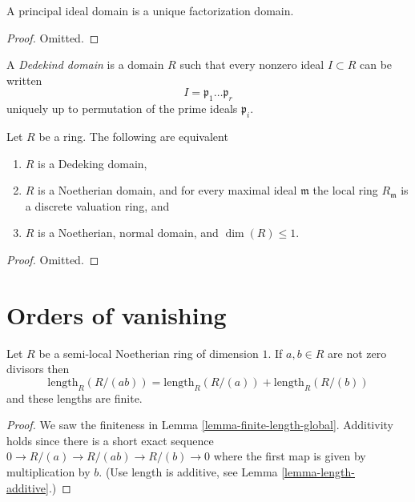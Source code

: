 \begin{lemma}
\label{lemma-PID-UFD}
A principal ideal domain is a unique factorization domain.
\end{lemma}

\begin{proof}
Omitted.
\end{proof}

\begin{definition}
\label{definition-dedekind-domain}
A {\it Dedekind domain} is a domain $R$ such that every
nonzero ideal $I \subset R$ can be written
$$
I = \mathfrak p_1 \ldots \mathfrak p_r
$$
uniquely up to permutation of the prime ideals $\mathfrak p_i$.
\end{definition}

\begin{lemma}
\label{lemma-characterize-Dedekind}
Let $R$ be a ring. The following are equivalent
\begin{enumerate}
\item $R$ is a Dedeking domain,
\item $R$ is a Noetherian domain, and for every maximal ideal $\mathfrak m$
the local ring $R_{\mathfrak m}$ is a discrete valuation ring, and
\item $R$ is a Noetherian, normal domain, and $\dim(R) \leq 1$.
\end{enumerate}
\end{lemma}

\begin{proof}
Omitted.
\end{proof}






\section{Orders of vanishing}
\label{section-orders-of-vanishing}

\begin{lemma}
\label{lemma-ord-additive}
Let $R$ be a semi-local Noetherian ring of dimension $1$.
If $a, b \in R$ are not zero divisors then
$$
\text{length}_R(R/(ab)) =
\text{length}_R(R/(a)) +
\text{length}_R(R/(b))
$$
and these lengths are finite.
\end{lemma}

\begin{proof}
We saw the finiteness in Lemma \ref{lemma-finite-length-global}.
Additivity holds since there is a short exact sequence
$0 \to R/(a) \to R/(ab) \to R/(b) \to 0$ where the first map
is given by multiplication by $b$. (Use length is additive,
see Lemma \ref{lemma-length-additive}.)
\end{proof}

